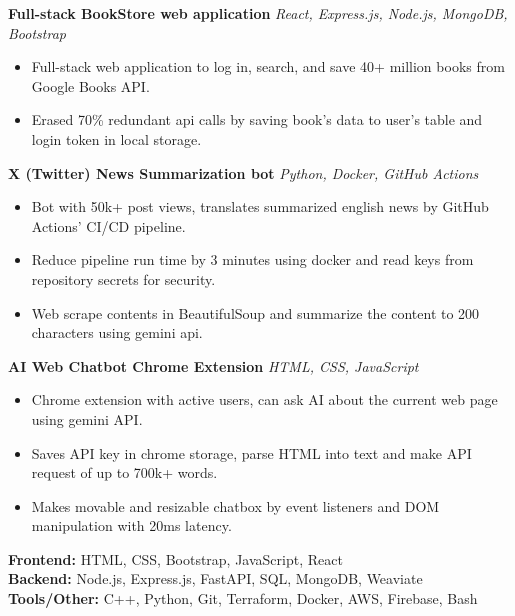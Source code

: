 \documentclass[letterpaper,12pt]{article}
\begin{document}
\textbf{Full-stack BookStore web application}
\href{https://bookstore-backend.fly.dev/}{\faGlobe}
\href{https://github.com/uliba3/BookStore-backend}{\faGithub}
\textit{React, Express.js, Node.js, MongoDB, Bootstrap}
\begin{itemize}
    \item Full-stack web application to log in, search, and save 40+ million books from Google Books API.
    \item Erased 70\% redundant api calls by saving book's data to user's table and login token in local storage.
\end{itemize}

\textbf{X (Twitter) News Summarization bot}
\href{https://x.com/NewsWorldJapan}{\faGlobe}
\href{https://github.com/uliba3/News_World_Japan_X_bot}{\faGithub}
\textit{Python, Docker, GitHub Actions}
\begin{itemize}
    \item Bot with 50k+ post views, translates summarized english news by GitHub Actions' CI/CD pipeline.
    \item Reduce pipeline run time by 3 minutes using docker and read keys from repository secrets for security.
    \item Web scrape contents in BeautifulSoup and summarize the content to 200 characters using gemini api.
\end{itemize}

\textbf{AI Web Chatbot Chrome Extension}
\href{https://chromewebstore.google.com/detail/eeckhenackiojmofodkcoogkkfggkkap}{\faGlobe}
\href{https://github.com/uliba3/ai-web-chatbot}{\faGithub}
\textit{HTML, CSS, JavaScript}
\begin{itemize}
    \item Chrome extension with active users, can ask AI about the current web page using gemini API.
    \item Saves API key in chrome storage, parse HTML into text and make API request of up to 700k+ words.
    \item Makes movable and resizable chatbox by event listeners and DOM manipulation with 20ms latency.
\end{itemize}

\textbf{Frontend:} \textnormal{HTML, CSS, Bootstrap, JavaScript, React}\\
\textbf{Backend:} \textnormal{Node.js, Express.js, FastAPI, SQL, MongoDB, Weaviate}\\
\textbf{Tools/Other:} \textnormal{C++, Python, Git, Terraform, Docker, AWS, Firebase, Bash}\\
\end{document}
